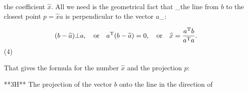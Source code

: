 the coefficient \(\widehat{x}\). All we need is the geometrical fact that _the line from \(b\) to the closest point \(p=\widehat{x}a\) is perpendicular to the vector \(a\)_:

\[(b-\widehat{a})\bot a,\quad\mbox{or}\quad a^{\rm T}(b-\widehat{a})=0,\quad \mbox{or}\quad\widehat{x}=\frac{a^{\rm T}b}{a^{\rm T}a}.\] (4)

That gives the formula for the number \(\widehat{x}\) and the projection \(p\):

**3H** The projection of the vector \(b\) onto the line in the direction of \ 